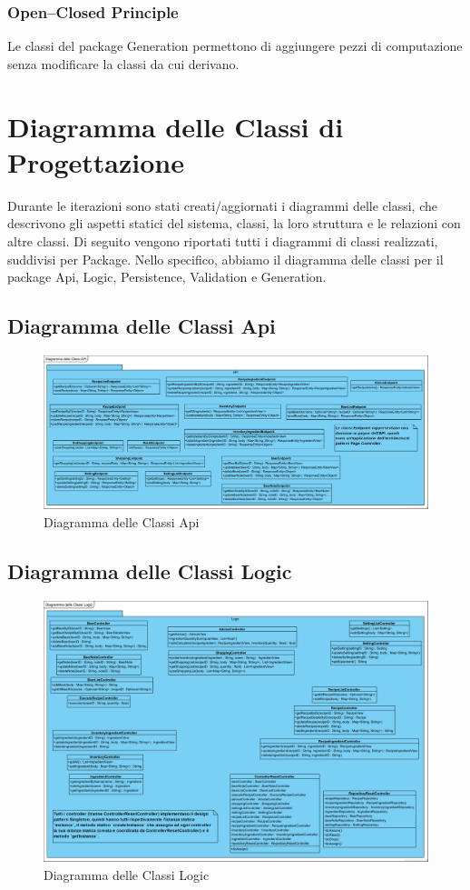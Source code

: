 \documentclass[a4paper,12pt]{report}
\begin{document}
			\subsubsection{Open–Closed Principle}
Le classi del package Generation permettono di aggiungere pezzi di computazione senza modificare la classi da cui derivano.

         
         \section{Diagramma delle Classi di Progettazione}
Durante le iterazioni sono stati creati/aggiornati i diagrammi delle classi, che descrivono gli aspetti statici del sistema, classi, la loro struttura e le relazioni con altre classi.
Di seguito vengono riportati tutti i diagrammi di classi realizzati, suddivisi per Package. Nello specifico, abbiamo il diagramma delle classi per il package Api, Logic, Persistence, Validation e Generation.

		\subsection{Diagramma delle Classi Api}
			\begin{figure}[!h]
				\centering
				\includegraphics[width=01\linewidth]{image/Diagramma-delle-Classi-Api.png}
				\caption{Diagramma delle Classi  Api}\label{fig:1}
			\end{figure}         		
\newpage			
  		\subsection{Diagramma delle Classi Logic}
			\begin{figure}[!h]
				\centering
				\includegraphics[width=0.9\linewidth]{image/Diagramma-delle-Classi-Logic.png}
				\caption{Diagramma delle Classi Logic  }\label{fig:1}
			\end{figure}  
			
\end{document}
